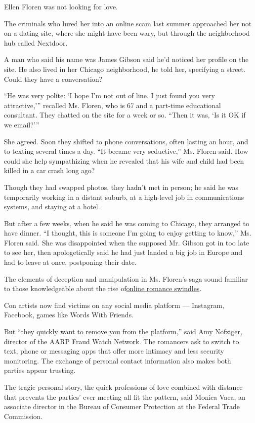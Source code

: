 Ellen Floren was not looking for love.

The criminals who lured her into an online scam last summer approached
her not on a dating site, where she might have been wary, but through
the neighborhood hub called Nextdoor.

A man who said his name was James Gibson said he'd noticed her profile
on the site. He also lived in her Chicago neighborhood, he told her,
specifying a street. Could they have a conversation?

``He was very polite: `I hope I'm not out of line. I just found you very
attractive,''' recalled Ms. Floren, who is 67 and a part-time
educational consultant. They chatted on the site for a week or so.
``Then it was, `Is it OK if we email?'''

She agreed. Soon they shifted to phone conversations, often lasting an
hour, and to texting several times a day. ``It became very seductive,''
Ms. Floren said. How could she help sympathizing when he revealed that
his wife and child had been killed in a car crash long ago?

Though they had swapped photos, they hadn't met in person; he said he
was temporarily working in a distant suburb, at a high-level job in
communications systems, and staying at a hotel.

But after a few weeks, when he said he was coming to Chicago, they
arranged to have dinner. ``I thought, this is someone I'm going to enjoy
getting to know,'' Ms. Floren said. She was disappointed when the
supposed Mr. Gibson got in too late to see her, then apologetically said
he had just landed a big job in Europe and had to leave at once,
postponing their date.

The elements of deception and manipulation in Ms. Floren's saga sound
familiar to those knowledgeable about the rise
of\href{https://www.consumer.ftc.gov/articles/what-you-need-know-about-romance-scams}{online
romance swindles}.

Con artists now find victims on any social media platform --- Instagram,
Facebook, games like Words With Friends.

But ``they quickly want to remove you from the platform,'' said Amy
Nofziger, director of the AARP Fraud Watch Network. The romancers ask to
switch to text, phone or messaging apps that offer more intimacy and
less security monitoring. The exchange of personal contact information
also makes both parties appear trusting.

The tragic personal story, the quick professions of love combined with
distance that prevents the parties' ever meeting all fit the pattern,
said Monica Vaca, an associate director in the Bureau of Consumer
Protection at the Federal Trade Commission.


